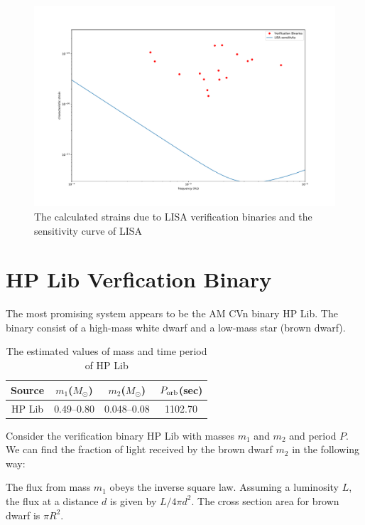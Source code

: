 \documentclass[10pt,a4paper]{article}
\begin{document}
\begin{figure}[ht]
\centering
\includegraphics[scale=0.25]{../Figures/strain_verific_binary.pdf}
\caption{The calculated strains due to LISA verification binaries and the sensitivity curve of LISA}
\end{figure}

\section{HP Lib Verfication Binary}

The most promising system appears to be the AM CVn binary HP Lib. The binary consist of a high-mass white dwarf and a low-mass star (brown dwarf).

\begin{table}[H]
\centering
\begin{tabular}{|c|c|c|c|}
\hline 
\rule[-1ex]{0pt}{2.5ex} Source & $m_1$($M_{\odot}$) & $m_2$($M_{\odot}$) & $P_{\rm orb}$(sec) \\ 
\hline 
\rule[-1ex]{0pt}{2.5ex} HP Lib & 0.49--0.80 & 0.048--0.08 & 1102.70 \\ 
\hline 
\end{tabular}
\caption{The estimated values of mass and time period of HP Lib}
\end{table}

Consider the verification binary HP Lib with masses $m_1$ and $m_2$
and period $P$. We can find the fraction of light received by the
brown dwarf $m_2$ in the following way:

The flux from mass $m_1$ obeys the inverse square law. Assuming a
luminosity $L$, the flux at a distance $d$ is given by $L/4 \pi
d^2$. The cross section area for brown dwarf is $\pi R^2$.
\end{document}
